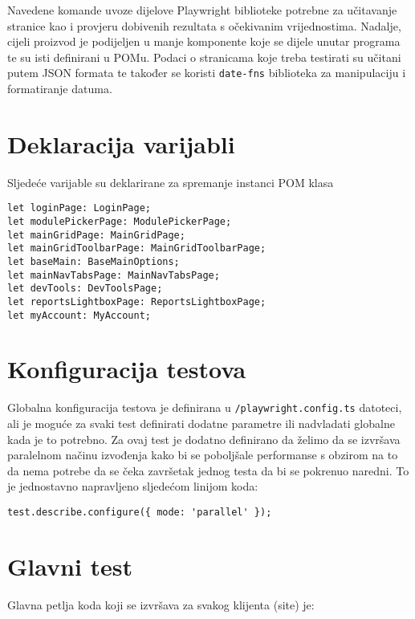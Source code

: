 Navedene komande uvoze dijelove Playwright biblioteke potrebne za učitavanje stranice kao i provjeru dobivenih rezultata s očekivanim vrijednostima.
Nadalje, cijeli proizvod je podijeljen u manje komponente koje se dijele unutar programa te su isti definirani u POMu.
Podaci o stranicama koje treba testirati su učitani putem JSON formata te također se koristi \texttt{date-fns} biblioteka za manipulaciju i formatiranje datuma.

\section{Deklaracija varijabli}
Sljedeće varijable su deklarirane za spremanje instanci POM klasa

\begin{verbatim}
let loginPage: LoginPage;
let modulePickerPage: ModulePickerPage;
let mainGridPage: MainGridPage;
let mainGridToolbarPage: MainGridToolbarPage;
let baseMain: BaseMainOptions;
let mainNavTabsPage: MainNavTabsPage;
let devTools: DevToolsPage;
let reportsLightboxPage: ReportsLightboxPage;
let myAccount: MyAccount;
\end{verbatim}

\section{Konfiguracija testova}
Globalna konfiguracija testova je definirana u \texttt{/playwright.config.ts} datoteci, ali je moguće za svaki test definirati dodatne parametre ili nadvladati globalne kada je to potrebno.
Za ovaj test je dodatno definirano da želimo da se izvršava paralelnom načinu izvođenja kako bi se poboljšale performanse s obzirom na to da nema potrebe da se čeka završetak jednog testa da bi se pokrenuo naredni.
To je jednostavno napravljeno sljedećom linijom koda:
\begin{verbatim}
test.describe.configure({ mode: 'parallel' });
\end{verbatim}

\section{Glavni test}
Glavna petlja koda koji se izvršava za svakog klijenta (site) je:

